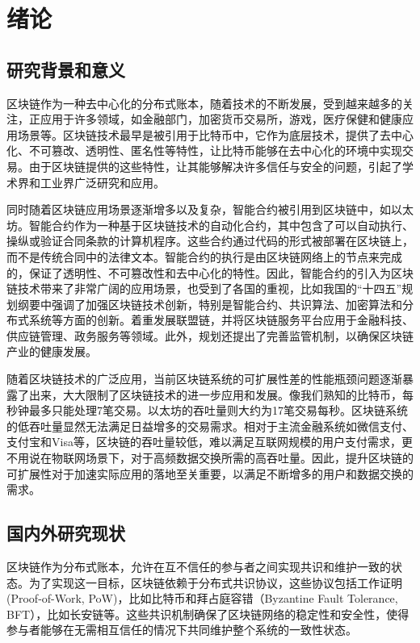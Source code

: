 
\chapter{绪论}

\section{研究背景和意义}
区块链作为一种去中心化的分布式账本，随着技术的不断发展，受到越来越多的关注，正应用于许多领域，如金融部门，加密货币交易所，游戏，医疗保健和健康应用场景等。区块链技术最早是被引用于比特币中，它作为底层技术，提供了去中心化、不可篡改、透明性、匿名性等特性，让比特币能够在去中心化的环境中实现交易。由于区块链提供的这些特性，让其能够解决许多信任与安全的问题，引起了学术界和工业界广泛研究和应用。

同时随着区块链应用场景逐渐增多以及复杂，智能合约被引用到区块链中，如以太坊。智能合约作为一种基于区块链技术的自动化合约，其中包含了可以自动执行、操纵或验证合同条款的计算机程序。这些合约通过代码的形式被部署在区块链上，而不是传统合同中的法律文本。智能合约的执行是由区块链网络上的节点来完成的，保证了透明性、不可篡改性和去中心化的特性。因此，智能合约的引入为区块链技术带来了非常广阔的应用场景，也受到了各国的重视，比如我国的“十四五”规划纲要中强调了加强区块链技术创新，特别是智能合约、共识算法、加密算法和分布式系统等方面的创新。着重发展联盟链，并将区块链服务平台应用于金融科技、供应链管理、政务服务等领域。此外，规划还提出了完善监管机制，以确保区块链产业的健康发展。

随着区块链技术的广泛应用，当前区块链系统的可扩展性差的性能瓶颈问题逐渐暴露了出来，大大限制了区块链技术的进一步应用和发展。像我们熟知的比特币，每秒钟最多只能处理7笔交易。以太坊的吞吐量则大约为17笔交易每秒。区块链系统的低吞吐量显然无法满足日益增多的交易需求。相对于主流金融系统如微信支付、支付宝和Visa等，区块链的吞吐量较低，难以满足互联网规模的用户支付需求，更不用说在物联网场景下，对于高频数据交换所需的高吞吐量。因此，提升区块链的可扩展性对于加速实际应用的落地至关重要，以满足不断增多的用户和数据交换的需求。

\section{国内外研究现状}
区块链作为分布式账本，允许在互不信任的参与者之间实现共识和维护一致的状态。为了实现这一目标，区块链依赖于分布式共识协议，这些协议包括工作证明(Proof-of-Work, PoW)，比如比特币和拜占庭容错（Byzantine Fault Tolerance, BFT），比如长安链等。这些共识机制确保了区块链网络的稳定性和安全性，使得参与者能够在无需相互信任的情况下共同维护整个系统的一致性状态。

